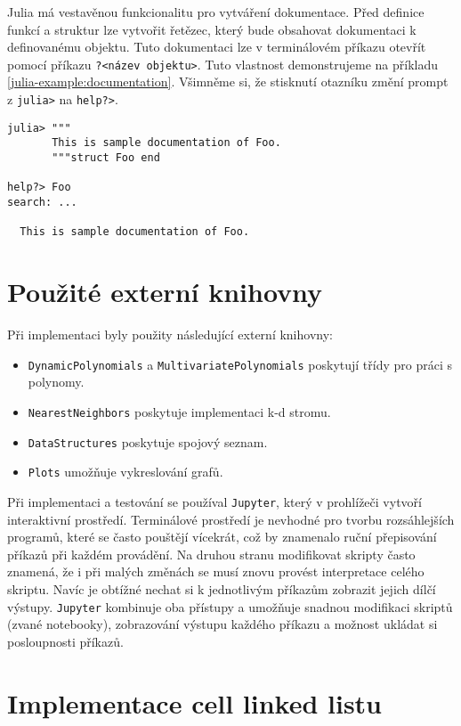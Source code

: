 Julia má vestavěnou funkcionalitu pro vytváření dokumentace. Před definice funkcí a struktur lze vytvořit řetězec, který bude obsahovat dokumentaci k definovanému objektu. Tuto dokumentaci lze v terminálovém příkazu otevřít pomocí příkazu \texttt{?<název objektu>}. Tuto vlastnost demonstrujeme na příkladu \ref{julia-example:documentation}. Všimněme si, že stisknutí otazníku změní prompt z \texttt{julia>} na \texttt{help?>}.
\begin{lstlisting}[caption={Demonstrace vestavěné dokumentace v Julii.}, label={julia-example:documentation}]
julia> """
       This is sample documentation of Foo.
       """struct Foo end

help?> Foo
search: ...

  This is sample documentation of Foo.
\end{lstlisting}

\section{Použité externí knihovny}

Při implementaci byly použity následující externí knihovny:
\begin{itemize}
  \item \texttt{DynamicPolynomials} a \texttt{MultivariatePolynomials} poskytují třídy pro práci s polynomy.
  \item \texttt{NearestNeighbors} poskytuje implementaci k-d stromu.
  \item \texttt{DataStructures} poskytuje spojový seznam.
  \item \texttt{Plots} umožňuje vykreslování grafů.
\end{itemize}

Při implementaci a testování se používal \texttt{Jupyter}, který v prohlížeči vytvoří interaktivní prostředí. Terminálové prostředí je nevhodné pro tvorbu rozsáhlejších programů, které se často pouštějí vícekrát, což by znamenalo ruční přepisování příkazů při každém provádění. Na druhou stranu modifikovat skripty často znamená, že i při malých změnách se musí znovu provést interpretace celého skriptu. Navíc je obtížné nechat si k jednotlivým příkazům zobrazit jejich dílčí výstupy. \texttt{Jupyter} kombinuje oba přístupy a umožňuje snadnou modifikaci skriptů (zvané notebooky), zobrazování výstupu každého příkazu a možnost ukládat si posloupnosti příkazů.

\section{Implementace cell linked listu}

